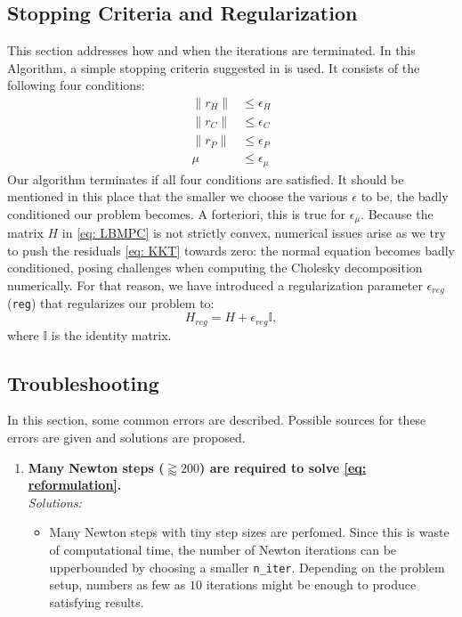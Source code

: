 \documentclass[letter]{article}
\begin{document}
\begin{sffamily}
\subsection{Stopping Criteria and Regularization}
This section addresses how and when the iterations are terminated. In this Algorithm, a simple stopping criteria suggested in \citep{Jorgensen2006, Krueth2008, Boyd2004ConvOpt} is used. It consists of the following four conditions:
\begin{align}
\label{eq: stoppingCriteria}
	\|r_H\| &\leq \epsilon_H \\
	\|r_C\| &\leq \epsilon_C	\nonumber \\
	\|r_P\| &\leq \epsilon_P	\nonumber  \\
	\mu &\leq \epsilon_\mu \nonumber 
\end{align}
Our algorithm terminates if all four conditions are satisfied. It should be mentioned in this place that the smaller we choose the various $\epsilon$ to be, the badly conditioned our problem becomes. A forteriori, this is true for $\epsilon_\mu$. Because the matrix $H$ in \eqref{eq: LBMPC} is not strictly convex, numerical issues arise as we try to push the residuals \eqref{eq: KKT} towards zero: the normal equation becomes badly conditioned, posing challenges when computing the Cholesky decomposition numerically. For that reason, we have introduced a regularization parameter $\epsilon_{reg}$ (\texttt{reg}) that regularizes our problem to:
\begin{equation}
\label{eq: regularization}
	H_{reg} = H + \epsilon_{reg}\mathbb{I},
\end{equation}
where $\mathbb{I}$ is the identity matrix.

\subsection{Troubleshooting}
In this section, some common errors are described. Possible sources for these errors are given and solutions are proposed.
\begin{enumerate}	
	\item \textbf{Many Newton steps ($\gtrapprox 200$) are required to solve \eqref{eq: reformulation}.} \\
		\emph{Solutions:}
			\begin{itemize}				
				\item Many Newton steps with tiny step sizes are perfomed. Since this is waste of computational time, the number of Newton iterations can be upperbounded by choosing a smaller \texttt{n\_iter}. Depending on the problem setup, numbers as few as $10$ iterations might be enough to produce satisfying results.
			\end{itemize}
	

\end{enumerate}
\end{sffamily}
\end{document}
